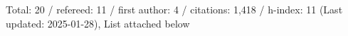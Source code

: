 Total: 20 / refereed: 11 / first author: 4 / citations: 1,418 / h-index: 11 (Last updated: 2025-01-28), List attached below